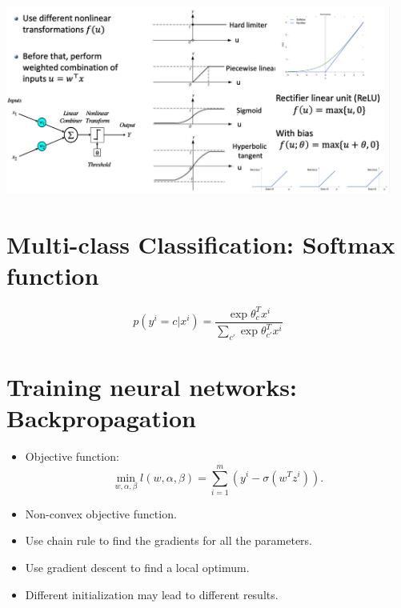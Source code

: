 \documentclass[twoside,12pt]{article}
\begin{document}
\begin{center}
\includegraphics[width=0.95\textwidth]{activations.png}
\end{center}
\section{Multi-class Classification: Softmax function}
$$p(y^i = c| x^i) = \frac{\exp{\theta_c^T x^i}}{\sum_{c'} \exp{\theta_{c'}^T x^i}}$$

\section{Training neural networks: Backpropagation}
\begin{itemize}
\item Objective function: $$\min_{w,\alpha, \beta} l(w,\alpha, \beta) = \sum_{i = 1}^m (y^i - \sigma(w^Tz^i)).$$
\item Non-convex objective function.
\item Use chain rule to find the gradients for all the parameters.
\item Use gradient descent to find a local optimum. 
\item Different initialization may lead to different results.
\end{itemize}
\end{document}
